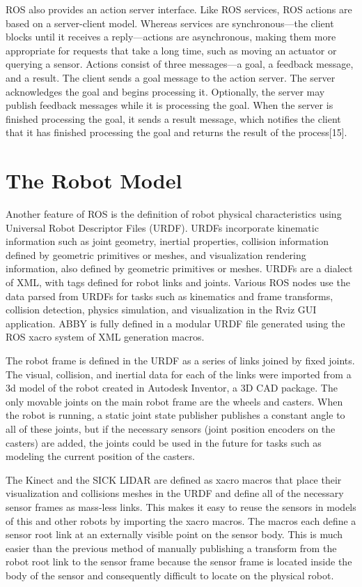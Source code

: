 \documentclass[]{cwru} %
\begin{document}
ROS also provides an action server interface. Like ROS services, ROS
actions are based on a server-client model. Whereas services are
synchronous---the client blocks until it receives a reply---actions are
asynchronous, making them more appropriate for requests that take a long
time, such as moving an actuator or querying a sensor. Actions consist
of three messages---a goal, a feedback message, and a result. The client
sends a goal message to the action server. The server acknowledges the
goal and begins processing it. Optionally, the server may publish
feedback messages while it is processing the goal. When the server is
finished processing the goal, it sends a result message, which notifies
the client that it has finished processing the goal and returns the
result of the process{[}15{]}.

\section{The Robot Model}

Another feature of ROS is the definition of robot physical
characteristics using Universal Robot Descriptor Files (URDF). URDFs
incorporate kinematic information such as joint geometry, inertial
properties, collision information defined by geometric primitives or
meshes, and visualization rendering information, also defined by
geometric primitives or meshes. URDFs are a dialect of XML, with tags
defined for robot links and joints. Various ROS nodes use the data
parsed from URDFs for tasks such as kinematics and frame transforms,
collision detection, physics simulation, and visualization in the Rviz
GUI application. ABBY is fully defined in a modular URDF file generated
using the ROS xacro system of XML generation macros.

The robot frame is defined in the URDF as a series of links joined by
fixed joints. The visual, collision, and inertial data for each of the
links were imported from a 3d model of the robot created in Autodesk
Inventor, a 3D CAD package. The only movable joints on the main robot
frame are the wheels and casters. When the robot is running, a static
joint state publisher publishes a constant angle to all of these joints,
but if the necessary sensors (joint position encoders on the casters)
are added, the joints could be used in the future for tasks such as
modeling the current position of the casters.

The Kinect and the SICK LIDAR are defined as xacro macros that place
their visualization and collisions meshes in the URDF and define all of
the necessary sensor frames as mass-less links. This makes it easy to
reuse the sensors in models of this and other robots by importing the
xacro macros. The macros each define a sensor root link at an externally
visible point on the sensor body. This is much easier than the previous
method of manually publishing a transform from the robot root link to
the sensor frame because the sensor frame is located inside the body of
the sensor and consequently difficult to locate on the physical robot.
\end{document}
